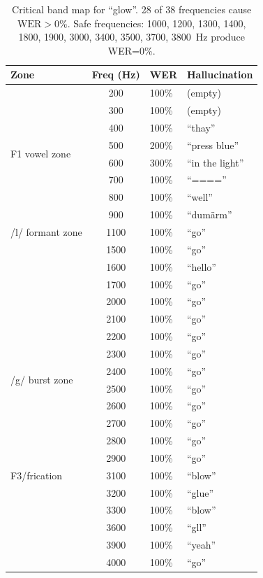 \documentclass[11pt,a4paper]{article}
\begin{document}
\begin{table}[H]
\centering
\caption{Critical band map for ``glow''. 28 of 38 frequencies cause
$\text{WER}>0\%$. Safe frequencies: 1000, 1200, 1300, 1400, 1800, 1900, 3000,
3400, 3500, 3700, 3800~Hz produce WER=0\%.}
\label{tab:glow_critical}
\begin{tabular}{@{}lclp{5cm}@{}}
\toprule
\textbf{Zone} & \textbf{Freq (Hz)} & \textbf{WER} & \textbf{Hallucination} \\
\midrule
\multirow{8}{*}{F1 vowel zone}
& 200 & 100\% & (empty) \\
& 300 & 100\% & (empty) \\
& 400 & 100\% & ``thay'' \\
& 500 & 200\% & ``press blue'' \\
& 600 & 300\% & ``in the light'' \\
& 700 & 100\% & ``===='' \\
& 800 & 100\% & ``well'' \\
& 900 & 100\% & ``dum\"arm'' \\
\midrule
/l/ formant zone
& 1100 & 100\% & ``go'' \\
& 1500 & 100\% & ``go'' \\
& 1600 & 100\% & ``hello'' \\
& 1700 & 100\% & ``go'' \\
\midrule
\multirow{10}{*}{/g/ burst zone}
& 2000 & 100\% & ``go'' \\
& 2100 & 100\% & ``go'' \\
& 2200 & 100\% & ``go'' \\
& 2300 & 100\% & ``go'' \\
& 2400 & 100\% & ``go'' \\
& 2500 & 100\% & ``go'' \\
& 2600 & 100\% & ``go'' \\
& 2700 & 100\% & ``go'' \\
& 2800 & 100\% & ``go'' \\
& 2900 & 100\% & ``go'' \\
\midrule
F3/frication
& 3100 & 100\% & ``blow'' \\
& 3200 & 100\% & ``glue'' \\
& 3300 & 100\% & ``blow'' \\
& 3600 & 100\% & ``gll'' \\
& 3900 & 100\% & ``yeah'' \\
& 4000 & 100\% & ``go'' \\
\bottomrule
\end{tabular}
\end{table}
\end{document}
